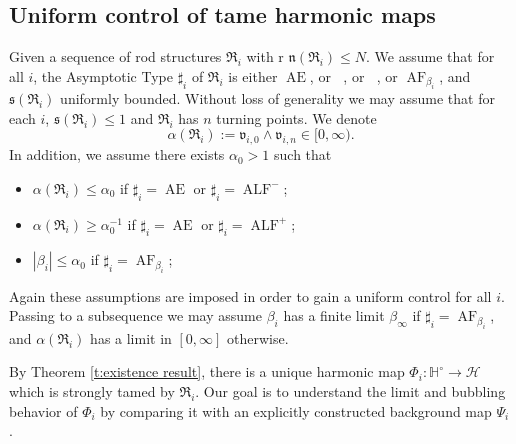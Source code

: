 \documentclass[a4paper,11pt]{amsart}
\theoremstyle{definition}
\numberwithin{equation}{section}
\newcommand{\dH}{\mathbb{H}}
\newcommand{\mv} {\mathfrak v}
\newcommand{\ms} {\mathfrak s}
\newcommand{\mR} {\mathfrak R}
\DeclareMathOperator{\Ae}{AE}
\DeclareMathOperator{\ALF}{ALF}
\DeclareMathOperator{\ALFp}{ALF^+}
\DeclareMathOperator{\ALFm}{ALF^{--}}
\DeclareMathOperator{\AF}{AF}
\begin{document}
\subsection{Uniform control of tame harmonic maps} 
\label{ss:uniform control of tame harmonic maps}

Given a sequence of rod structures \( \mathfrak{R}_i \) with r \( \mathfrak{n}(\mathfrak{R}_i) \leq N \). We assume that for all $i$,  the Asymptotic Type $\sharp_i$ of $\mR_i$ is either $\Ae$, or $\ALFp$, or $\ALFm$, or $\AF_{\beta_i}$, and  \( \mathfrak{s}(\mathfrak{R}_i) \) uniformly bounded. Without loss of generality we may assume that for each $i$, $\ms(\mR_i)\leq 1$ and $\mR_i$ has $n$ turning points. We denote  \[\alpha(\mR_i):=\mv_{i,0}\wedge \mv_{i,n}\in [0, \infty).\] In addition, we assume there exists $\alpha_0>1$ such that
\begin{itemize}
    \item  $\alpha(\mR_i)\leq \alpha_0$ if $\sharp_i=\Ae$ or $\sharp_i=\ALF^-$;
    \item  $ \alpha(\mR_i)\geq \alpha_0^{-1}$ if $\sharp_i=\Ae$ or $\sharp_i=\ALF^+$;
     \item  $|\beta_i|\leq \alpha_0$ if $\sharp_i=\AF_{\beta_i}$; 
\end{itemize}
Again these assumptions are imposed in order to gain a uniform control for all $i$. Passing to a subsequence we may assume $\beta_i$ has a finite limit $\beta_\infty$ if $\sharp_i=\AF_{\beta_i}$, and  $\alpha(\mR_i)$ has a limit in $[0, \infty]$ otherwise.


By Theorem \ref{t:existence result}, there is a unique harmonic map $\Phi_i:\dH^\circ\rightarrow\mathcal H$ which is strongly tamed by $\mR_i$. Our goal is to understand the limit and bubbling behavior of $\Phi_i$ by comparing it with an explicitly constructed background map $\Psi_i$. 
\end{document}
